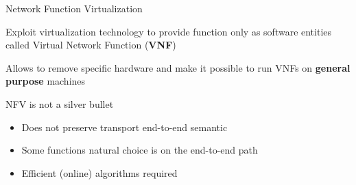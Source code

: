 \begin{frame}{Network Function Virtualization}

  Exploit virtualization technology to provide function only as
  software entities called Virtual Network Function (\textbf{VNF})

  \vfill{}

  Allows to remove specific hardware and make it possible to run VNFs on
  \textbf{general purpose} machines

  \vfill{}

  NFV is not a silver bullet
  \begin{itemize}
    \item Does not preserve transport end-to-end semantic
    \item Some functions natural choice is on the end-to-end path
    \item Efficient (online) algorithms required
  \end{itemize}

  \vfill{}

\end{frame}